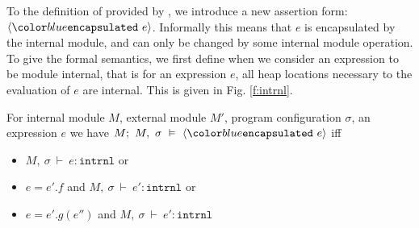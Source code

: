 \documentclass[acmsmall,review,anonymous]{acmart}\settopmatter{printfolios=true,printccs=false,printacmref=false}
\begin{document}
To the definition of \Chainmail provided by \citeauthor{FASE}, we introduce a new assertion form: $\encapsulated{e}$.
Informally this means that $e$ is encapsulated by the internal module, and can only be changed by some internal module
operation. To give the formal semantics, we first define when we consider an expression to be module internal, that is
for an expression $e$, all heap locations necessary to the evaluation of $e$ are internal. This is given in Fig. \ref{f:intrnl}.
\begin{definition}[Encapsulation]
For internal module $M$, external module $M'$, program configuration $\sigma$, an expression $e$ we have
$M;\ M,\ \sigma\ \vDash\ \encapsulated{e}$ iff 
\begin{itemize}
\item
$M,\ \sigma\ \vdash\ e : \texttt{intrnl}$ or
\item
$e = e'.f$ and $M,\ \sigma\ \vdash\ e' : \texttt{intrnl}$ or
\item
$e = e'.g(e'')$ and $M,\ \sigma\ \vdash\ e' : \texttt{intrnl}$
\end{itemize}
\end{definition}
	
\end{document}
